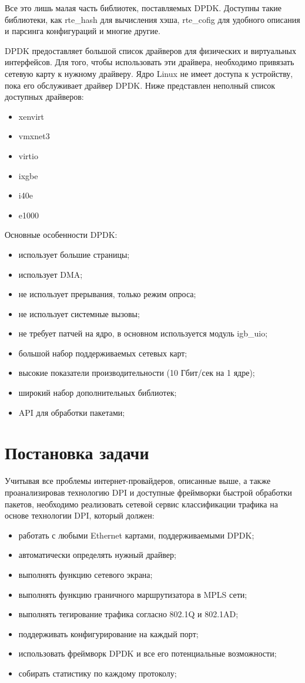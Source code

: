 Все это лишь малая часть библиотек, поставляемых DPDK. Доступны такие библиотеки, как rte\_hash для вычисления хэша, rte\_cofig для удобного описания и парсинга конфигураций и многие другие.

DPDK предоставляет большой список драйверов для физических и виртуальных интерфейсов. Для того, чтобы использовать эти драйвера, необходимо привязать сетевую карту к нужному драйверу. Ядро Linux не имеет доступа к устройству, пока его обслуживает драйвер DPDK. Ниже представлен неполный список доступных драйверов:
\begin{itemize}
\item xenvirt
\item vmxnet3
\item virtio
\item ixgbe
\item i40e
\item e1000
\end{itemize}

Основные особенности DPDK:
\begin{itemize}
\item использует большие страницы;
\item использует DMA;
\item не использует прерывания, только режим опроса;
\item не использует системные вызовы;
\item не требует патчей на ядро, в основном используется модуль igb\_uio;
\item большой набор поддерживаемых сетевых карт;
\item высокие показатели производительности (10 Гбит/сек на 1 ядре);
\item широкий набор дополнительных библиотек;
\item API для обработки пакетами;
\end{itemize}

\section{Постановка задачи}
Учитывая все проблемы интернет-провайдеров, описанные выше, а также проанализировав технологию DPI и доступные фреймворки быстрой обработки пакетов, необходимо реализовать сетевой сервис классификации трафика на основе технологии DPI, который должен:
\begin{itemize}
\item работать с любыми Ethernet картами, поддерживаемыми DPDK;
\item автоматически определять нужный драйвер;
\item выполнять функцию сетевого экрана;
\item выполнять функцию граничного маршрутизатора в MPLS сети;
\item выполнять тегирование трафика согласно 802.1Q и 802.1AD;
\item поддерживать конфигурирование на каждый порт;
\item использовать фреймворк DPDK и все его потенциальные возможности;
\item собирать статистику по каждому протоколу;
\end{itemize}

